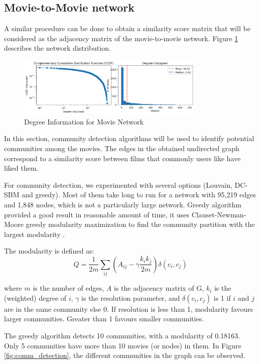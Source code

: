 \documentclass[12pt]{article}
\numberwithin{equation}{section}
\begin{document}
\subsection{Movie-to-Movie network}

A similar procedure can be done to obtain a similarity score matrix that will be considered as the adjacency matrix of the movie-to-movie network. Figure \ref{fig:MN_degreeinfo} describes the network distribution. 

\begin{figure}[h]
    \centering
  	\includegraphics[width=0.8\textwidth]{movie2movie_analysis.png}
  	\caption{Degree Information for Movie Network}
  	\label{fig:MN_degreeinfo}
\end{figure}

In this section, community detection algorithms will be used to identify potential communities among the movies. The edges in the obtained undirected graph correspond to a similarity score between films that commonly users like have liked them. 

For community detection, we experimented with several options (Louvain, DC-SBM and greedy). Most of them take long to run for a network with 95,219 edges and 1,848 nodes, which is not a particularly large network. Greedy algorithm provided a good result in reasonable amount of time, it uses Clauset-Newman-Moore greedy modularity maximization to find the community partition with the largest modularity \cite{greedy}.

The modularity is defined as: 
\begin{equation}
Q = \frac{1}{2m} \sum_{ij} ( A_{ij} - \gamma \frac{k_i k_j}{2m}) \delta (c_i, c_j)
\end{equation}

where $m$ is the number of edges, $A$ is the adjacency matrix of G, $k_i$ is the (weighted) degree of $i$, $\gamma$ is the resolution parameter, and $\delta (c_i, c_j)$ is 1 if $i$ and $j$ are in the same community else 0. If resolution is less than 1, modularity favours larger communities. Greater than 1 favours smaller communities.

The greedy algorithm detects 10 communities, with a modularity of 0.18163. Only 5 communities have more than 10 movies (or nodes) in them. In Figure \ref{fig:comm_detection}, the different communities in the graph can be observed.
\end{document}
